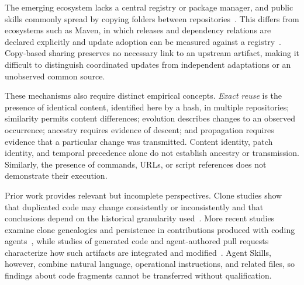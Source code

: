 \documentclass[conference]{IEEEtran}
\begin{document}
The emerging ecosystem lacks a central registry or package manager, and public skills commonly spread by copying folders between repositories~\cite{gitskills}. This differs from ecosystems such as Maven, in which releases and dependency relations are declared explicitly and update adoption can be measured against a registry~\cite{berretta2025}. Copy-based sharing preserves no necessary link to an upstream artifact, making it difficult to distinguish coordinated updates from independent adaptations or an unobserved common source.

These mechanisms also require distinct empirical concepts. \emph{Exact reuse} is the presence of identical content, identified here by a hash, in multiple repositories; similarity permits content differences; evolution describes changes to an observed occurrence; ancestry requires evidence of descent; and propagation requires evidence that a particular change was transmitted. Content identity, patch identity, and temporal precedence alone do not establish ancestry or transmission. Similarly, the presence of commands, URLs, or script references does not demonstrate their execution.

Prior work provides relevant but incomplete perspectives. Clone studies show that duplicated code may change consistently or inconsistently and that conclusions depend on the historical granularity used~\cite{krinke2007,bettenburg2012}. More recent studies examine clone genealogies and persistence in contributions produced with coding agents~\cite{sousa2026genealogy,uchoa2026lifecycle}, while studies of generated code and agent-authored pull requests characterize how such artifacts are integrated and modified~\cite{grewal2024,ogenrwot2026}. Agent Skills, however, combine natural language, operational instructions, and related files, so findings about code fragments cannot be transferred without qualification.
\end{document}

